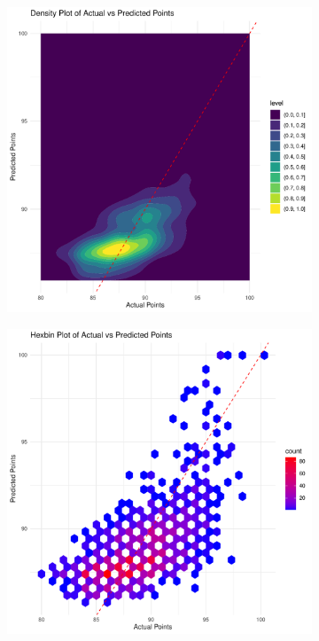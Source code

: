 \documentclass{article}
\begin{document}
\begin{figure}[htbp]
	\centering
	\begin{subfigure}{0.32\textwidth}
		\includegraphics[width=\textwidth]{imgs/Rplots-29.pdf}
	\end{subfigure}\hfill
	\begin{subfigure}{0.32\textwidth}
		\includegraphics[width=\textwidth]{imgs/Rplots-28.pdf}

\end{subfigure}
\end{figure}
\end{document}
